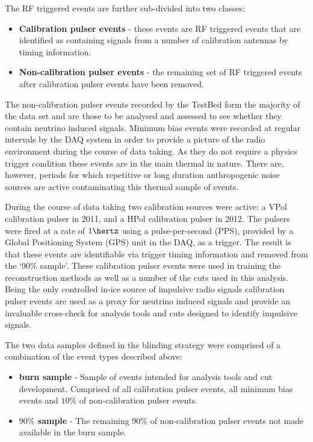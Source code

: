 The RF triggered events are further sub-divided into two classes:

\begin{itemize}
\item \textbf{Calibration pulser events} - these events are RF triggered events that are identified as containing signals from a number of calibration antennas by timing information. 
\item \textbf{Non-calibration pulser events} - the remaining set of RF triggered events after calibration pulser events have been removed.
\end{itemize}



The non-calibration pulser events recorded by the TestBed form the majority of the data set and are those to be analysed and assessed to see whether they contain neutrino induced signals. Minimum bias events were recorded at regular intervals by the DAQ system in order to provide a picture of the radio environment during the course of data taking. As they do not require a physics trigger condition these events are in the main thermal in nature. There are, however, periods for which repetitive or long duration anthropogenic noise sources are active contaminating this thermal sample of events.

During the course of data taking two calibration sources were active: a VPol calibration pulser in 2011, and a HPol calibration pulser in 2012. The pulsers were fired at a rate of $1 \hertz$ using a pulse-per-second (PPS), provided by a Global Positioning System (GPS) unit in the DAQ, as a trigger. The result is that these events are identifiable via trigger timing information and removed from the `$90 \%$ sample'. These calibration pulser events were used in training the reconstruction methods as well as a number of the cuts used in this analysis. Being the only controlled in-ice source of impulsive radio signals calibration pulser events are used as a proxy for neutrino induced signals and provide an invaluable cross-check for analysis tools and cuts designed to identify impulsive signals.

The two data samples defined in the blinding strategy were comprised of a combination of the event types described above:

\begin{itemize}

\item \textbf{burn sample} - Sample of events intended for analysis tools and cut development. Comprised of all calibration pulser events, all minimum bias events and $10 \%$ of non-calibration pulser events.
\item \textbf{$90 \%$ sample} - The remaining $90 \%$ of non-calibration pulser events not made available in the burn sample.

\end{itemize}

